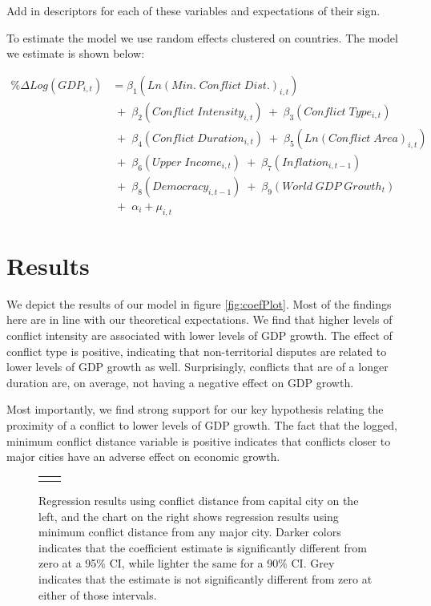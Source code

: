 Add in descriptors for each of these variables and expectations of their sign.

To estimate the model we use random effects clustered on countries. The model we estimate is shown below:

\begin{align*}
	\% \Delta Log(GDP_{i,t}) &= \beta_{1}(Ln(Min. \; Conflict \; Dist.)_{i,t}) \\
	& \;+\; \beta_{2}(Conflict \; Intensity_{i,t}) \;+\; \beta_{3}(Conflict \; Type_{i,t}) \\
	& \;+\; \beta_{4}(Conflict \; Duration_{i,t}) \;+\; \beta_{5}(Ln(Conflict \; Area)_{i,t}) \\	
	& \;+\; \beta_{6}(Upper \; Income_{i,t}) \;+\; \beta_{7}(Inflation_{i,t-1}) \\
	&  \;+\; \beta_{8}(Democracy_{i,t-1}) \;+\; \beta_{9}(World \; GDP \; Growth_{t}) \\
	& \;+\; \alpha_{i} + \mu_{i,t}
\end{align*}

\section{Results}
\label{findings} 

We depict the results of our model in figure \ref{fig:coefPlot}. Most of the findings here are in line with our theoretical expectations. We find that higher levels of conflict intensity are associated with lower levels of GDP growth. The effect of conflict type is positive, indicating that non-territorial disputes are related to lower levels of GDP growth as well. Surprisingly, conflicts that are of a longer duration are, on average, not having a negative effect on GDP growth. 

Most importantly, we find strong support for our key hypothesis relating the proximity of a conflict to lower levels of GDP growth. The fact that the logged, minimum conflict distance variable is positive indicates that conflicts closer to major cities have an adverse effect on economic growth. 

\begin{figure}
	\centering
	\begin{tabular}{cc}
		\subfloat[SubFigure 1][Capital City]{
			\resizebox{.45\textwidth}{!}{}
		\label{fig:capCoef}} &
		\subfloat[SubFigure 2][Any City]{
			\resizebox{.45\textwidth}{!}{}
		\label{fig:cityCoef}}
	\end{tabular}
	\caption{Regression results using conflict distance from capital city on the left, and the chart on the right shows regression results using minimum conflict distance from any major city. Darker colors indicates that the coefficient estimate is significantly different from zero at a 95\% CI, while lighter the same for a 90\% CI. Grey indicates that the estimate is not significantly different from zero at either of those intervals.}
	\label{fig:coefplot}
\end{figure}

